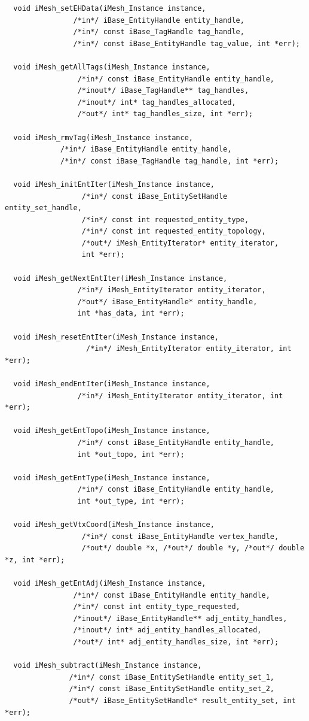 \documentclass{article}
\begin{document}
\begin{small}
\begin{verbatim}
  void iMesh_setEHData(iMesh_Instance instance,
			    /*in*/ iBase_EntityHandle entity_handle,
			    /*in*/ const iBase_TagHandle tag_handle,
			    /*in*/ const iBase_EntityHandle tag_value, int *err);

  void iMesh_getAllTags(iMesh_Instance instance,
			     /*in*/ const iBase_EntityHandle entity_handle,
			     /*inout*/ iBase_TagHandle** tag_handles,
			     /*inout*/ int* tag_handles_allocated,
			     /*out*/ int* tag_handles_size, int *err);

  void iMesh_rmvTag(iMesh_Instance instance,
			 /*in*/ iBase_EntityHandle entity_handle,
			 /*in*/ const iBase_TagHandle tag_handle, int *err);

  void iMesh_initEntIter(iMesh_Instance instance,
			      /*in*/ const iBase_EntitySetHandle entity_set_handle,
			      /*in*/ const int requested_entity_type,
			      /*in*/ const int requested_entity_topology,
			      /*out*/ iMesh_EntityIterator* entity_iterator,
			      int *err);

  void iMesh_getNextEntIter(iMesh_Instance instance,
				 /*in*/ iMesh_EntityIterator entity_iterator,
				 /*out*/ iBase_EntityHandle* entity_handle,
				 int *has_data, int *err);

  void iMesh_resetEntIter(iMesh_Instance instance,
			       /*in*/ iMesh_EntityIterator entity_iterator, int *err);

  void iMesh_endEntIter(iMesh_Instance instance,
			     /*in*/ iMesh_EntityIterator entity_iterator, int *err);

  void iMesh_getEntTopo(iMesh_Instance instance,
			     /*in*/ const iBase_EntityHandle entity_handle,
			     int *out_topo, int *err);

  void iMesh_getEntType(iMesh_Instance instance,
			     /*in*/ const iBase_EntityHandle entity_handle,
			     int *out_type, int *err);

  void iMesh_getVtxCoord(iMesh_Instance instance,
			      /*in*/ const iBase_EntityHandle vertex_handle,
			      /*out*/ double *x, /*out*/ double *y, /*out*/ double *z, int *err);

  void iMesh_getEntAdj(iMesh_Instance instance,
			    /*in*/ const iBase_EntityHandle entity_handle,
			    /*in*/ const int entity_type_requested,
			    /*inout*/ iBase_EntityHandle** adj_entity_handles,
			    /*inout*/ int* adj_entity_handles_allocated,
			    /*out*/ int* adj_entity_handles_size, int *err);

  void iMesh_subtract(iMesh_Instance instance,
			   /*in*/ const iBase_EntitySetHandle entity_set_1,
			   /*in*/ const iBase_EntitySetHandle entity_set_2,
			   /*out*/ iBase_EntitySetHandle* result_entity_set, int *err);


\end{verbatim}
\end{small}
\end{document}
